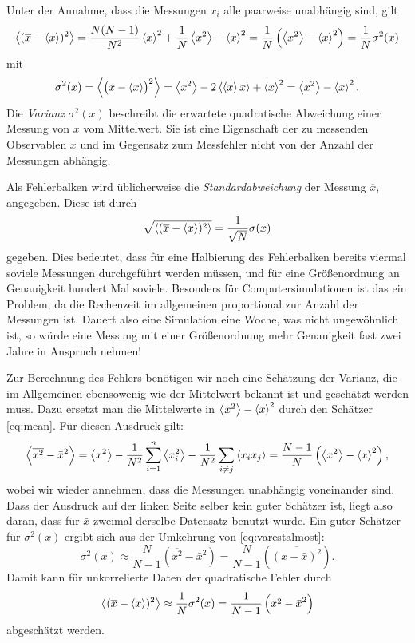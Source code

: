 Unter der Annahme, dass die Messungen $x_i$ alle paarweise unabhängig
sind, gilt
\begin{equation}
  \label{eq:errestvar}
  \left\langle{(\overline{x} - \left\langle{x}\right\rangle)^2}\right\rangle
  = \frac{N(N-1)}{N^2}\left\langle{x}\right\rangle^2 + \frac{1}{N}\left\langle{x^2}\right\rangle - \left\langle{x}\right\rangle^2
  = \frac{1}{N}\left(\left\langle{x^2}\right\rangle - \left\langle{x}\right\rangle^2\right)
  = \frac{1}{N}\sigma^2(x)
\end{equation}
mit
\begin{equation}
  \sigma^2(x) = \left\langle{\bigl(x-\left\langle{x}\right\rangle\bigr)^2}\right\rangle
  = \left\langle{x^2}\right\rangle - 2\left\langle{\left\langle{x}\right\rangle x}\right\rangle  + \left\langle{x}\right\rangle^2
  = \left\langle{x^2}\right\rangle - \left\langle{x}\right\rangle^2.
\end{equation}
Die \emph{Varianz} $\sigma^2(x)$ beschreibt die erwartete quadratische
Abweichung einer Messung von $x$ vom Mittelwert. Sie ist eine
Eigenschaft der zu messenden Observablen $x$ und im Gegensatz zum
Messfehler nicht von der Anzahl der Messungen abhängig.

Als Fehlerbalken wird üblicherweise die \emph{Standardabweichung} der
Messung $\overline{x}$, angegeben. Diese ist durch
\begin{equation}
  \sqrt{\left\langle{(\overline{x} - \left\langle{x}\right\rangle)^2}\right\rangle}
  = \frac{1}{\sqrt{N}}\sigma(x)
\end{equation}
gegeben. Dies bedeutet, dass für eine Halbierung des Fehlerbalken
bereits viermal soviele Messungen durchgeführt werden müssen, und für
eine Größenordnung an Genauigkeit hundert Mal soviele. Besonders für
Computersimulationen ist das ein Problem, da die Rechenzeit im
allgemeinen proportional zur Anzahl der Messungen ist. Dauert also
eine Simulation eine Woche, was nicht ungewöhnlich ist, so würde eine
Messung mit einer Größenordnung mehr Genauigkeit fast zwei Jahre in
Anspruch nehmen!

Zur Berechnung des Fehlers benötigen wir noch eine Schätzung der
Varianz, die im Allgemeinen ebensowenig wie der Mittelwert bekannt ist
und geschätzt werden muss. Dazu ersetzt man die Mittelwerte in
$\left\langle{x^2}\right\rangle - \left\langle{x}\right\rangle^2$ durch den Schätzer \eqref{eq:mean}. Für
diesen Ausdruck gilt:
\begin{equation}
  \label{eq:varestalmost}
  \left\langle{\overline{x^2} - \bar{x}^2}\right\rangle
  = \left\langle{x^2}\right\rangle - 
  \frac{1}{N^2}\sum_{i=1}^n \left\langle{x_i^2}\right\rangle
  - \frac{1}{N^2}\sum_{i\neq j} \left\langle{x_ix_j}\right\rangle
  = \frac{N-1}{N}\left(\left\langle{x^2}\right\rangle - \left\langle{x}\right\rangle^2\right),
\end{equation}
wobei wir wieder annehmen, dass die Messungen unabhängig voneinander
sind. Dass der Ausdruck auf der linken Seite selber kein guter
Schätzer ist, liegt also daran, dass für $\bar{x}$ zweimal derselbe
Datensatz benutzt wurde. Ein guter Schätzer für $\sigma^2(x)$ ergibt
sich aus der Umkehrung von \eqref{eq:varestalmost}:
\begin{equation}
  \label{eq:varest}
  \sigma^2(x) \approx \frac{N}{N-1}\left(\overline{x^2} -
    \bar{x}^2\right)
  = \frac{N}{N-1}\left(\overline{(x -
      \bar{x})^2}\right).
\end{equation}
Damit kann für unkorrelierte Daten der quadratische Fehler durch
\begin{equation}
  \label{eq:esterr}
  \left\langle{(\overline{x} - \left\langle{x}\right\rangle)^2}\right\rangle
  \approx \frac{1}{N}\sigma^2(x)
  = \frac{1}{N-1}\left(\overline{x^2} - \bar{x}^2\right)
\end{equation}
abgeschätzt werden.

